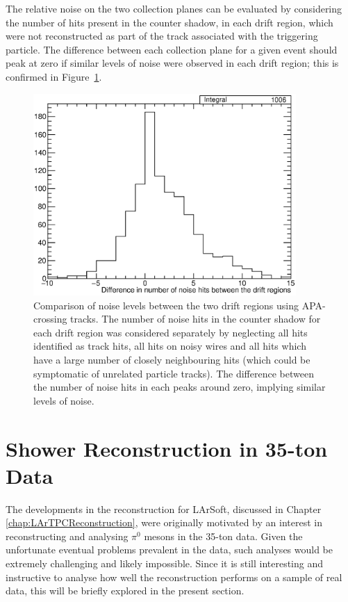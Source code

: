The relative noise on the two collection planes can be evaluated by considering the number of hits present in the counter shadow, in each drift region, which were not reconstructed as part of the track associated with the triggering particle.  The difference between each collection plane for a given event should peak at zero if similar levels of noise were observed in each drift region; this is confirmed in Figure~\ref{fig:CollectionPlaneNoise}.

\begin{figure}
  \centering
  \includegraphics[width=10cm]{CollectionPlaneNoise.eps}
  \caption[Comparison of noise levels between the two drift regions using APA-crossing tracks.]{Comparison of noise levels between the two drift regions using APA-crossing tracks.  The number of noise hits in the counter shadow for each drift region was considered separately by neglecting all hits identified as track hits, all hits on noisy wires and all hits which have a large number of closely neighbouring hits (which could be symptomatic of unrelated particle tracks).  The difference between the number of noise hits in each peaks around zero, implying similar levels of noise.}
  \label{fig:CollectionPlaneNoise}
\end{figure}

\section{Shower Reconstruction in 35-ton Data}\label{sec:ShowerData}

The developments in the reconstruction for LArSoft, discussed in Chapter \ref{chap:LArTPCReconstruction}, were originally motivated by an interest in reconstructing and analysing $\pi^0$ mesons in the 35-ton data.  Given the unfortunate eventual problems prevalent in the data, such analyses would be extremely challenging and likely impossible.  Since it is still interesting and instructive to analyse how well the reconstruction performs on a sample of real data, this will be briefly explored in the present section.

